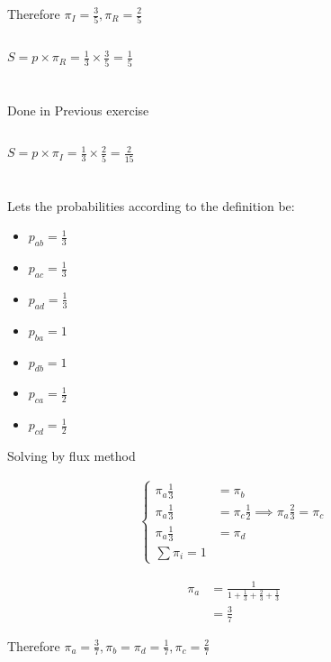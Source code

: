 \documentclass[12pt, a4paper]{article}
\begin{document}
Therefore $\pi_I = \frac{3}{5}, \pi_R = \frac{2}{5}$
\subsection{}
$S = p \times \pi_R = \frac{1}{3} \times \frac{3}{5} = \frac{1}{5}$

\section{}
\subsection{}
Done in Previous exercise
\subsection{}
$S = p \times \pi_I = \frac{1}{3} \times \frac{2}{5} = \frac{2}{15}$

\section{}
Lets the probabilities according to the definition be:
\begin{itemize}
  \item $p_{ab} = \frac{1}{3}$
  \item $p_{ac} = \frac{1}{3}$
  \item $p_{ad} = \frac{1}{3}$
  \item $p_{ba} = 1$
  \item $p_{db} = 1$
  \item $p_{ca} = \frac{1}{2}$
  \item $p_{cd} = \frac{1}{2}$
\end{itemize}

Solving by flux method

\begin{subequations}
  \begin{align}
    \begin{cases} 
      \pi_a \frac{1}{3} &= \pi_b\\
      \pi_a \frac{1}{3} &= \pi_c \frac{1}{2} \implies \pi_a \frac{2}{3} = \pi_c\\
      \pi_a \frac{1}{3} &= \pi_d\\
      \sum \pi_i = 1
    \end{cases}
  \end{align}
\end{subequations}

\begin{subequations}
  \begin{align}
    \pi_a &= \frac{1}{1+\frac{1}{3}+\frac{2}{3}+\frac{1}{3}}\\
          &= \frac{3}{7}
  \end{align}
\end{subequations}

Therefore $\pi_a = \frac{3}{7}, \pi_b = \pi_d = \frac{1}{7}, \pi_c = \frac{2}{7}$
\end{document}
